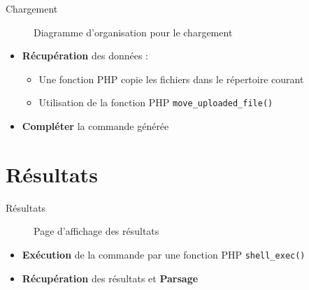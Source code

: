 \documentclass{beamer}
\begin{document}
\begin{frame}[fragile]{\textcolor{bleu2}{\hspace{1cm}Chargement}}
	\begin{figure}
		\begin{center}
			\caption{Diagramme d'organisation pour le chargement}
		\end{center}
	\end{figure}
	\begin{itemize}
		\item \textbf{Récupération} des données :
		\begin{itemize}
			\item Une fonction PHP copie les fichiers dans le répertoire courant
			 \item Utilisation de la fonction PHP {\footnotesize\texttt{move\_uploaded\_file()}}
		\end{itemize}
		\item \textbf{Compléter} la commande générée
	\end{itemize}
\end{frame}

\section{Résultats}

\begin{frame}{\textcolor{bleu2}{\hspace{1cm} Résultats}}
	\begin{figure}
		\begin{center}
			\caption{Page d'affichage des résultats}
		\end{center}
	\end{figure}
	\begin{itemize}
		\item \textbf{Exécution} de la commande par une fonction PHP {\footnotesize \texttt{shell\_exec()}}
		\item \textbf{Récupération} des résultats et \textbf{Parsage}
	\end{itemize}
\end{frame}
\end{document}
